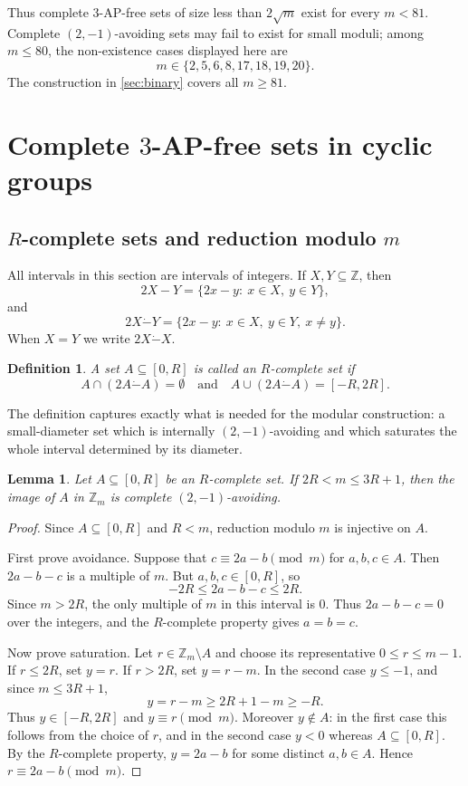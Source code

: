 \documentclass[11pt]{article}
\newtheorem{lemma}[theorem]{Lemma}
\newtheorem{definition}[theorem]{Definition}
\newcommand{\Z}{\mathbb Z}
\newcommand{\dotminus}{\mathbin{\dot{-}}}
\newcommand{\wt}{\mathrm{wt}}
\begin{document}
	Thus complete $3$-AP-free sets of size less than $2\sqrt m$ exist for every $m<81$.  Complete $(2,-1)$-avoiding sets may fail to exist for small moduli; among $m\le80$, the non-existence cases displayed here are
	\[
	m\in\{2,5,6,8,17,18,19,20\}.
	\]
	The construction in \cref{sec:binary} covers all $m\ge81$.
	\section{Complete $3$-AP-free sets in cyclic groups} \label{sec:cyclic}
	
	\subsection{$R$-complete sets and reduction modulo $m$}\label{sec: blocks}
	
	All intervals in this section are intervals of integers.  If $X,Y\subseteq\Z$, then
	\[
	2X-Y=\{2x-y:\ x\in X,\ y\in Y\},
	\]
	and
	\[
	2X\dotminus Y=\{2x-y:\ x\in X,\ y\in Y,\ x\ne y\}.
	\]
	When $X=Y$ we write $2X\dotminus X$.
	
	\begin{definition}\label{def:block}
		A set $A\subseteq[0,R]$ is called an \emph{$R$-complete set} if
		\[
		A\cap(2A\dotminus A)=\emptyset
		\quad\text{and}\quad
		A\cup(2A\dotminus A)=[-R,2R].
		\]
	\end{definition}
	
	The definition captures exactly what is needed for the modular construction: a small-diameter set which is internally $(2,-1)$-avoiding and which saturates the whole interval determined by its diameter.
	
	\begin{lemma}\label{lem:modreduction}
		Let $A\subseteq[0,R]$ be an $R$-complete set.  If
		$  2R<m\le 3R+1$,
		then the image of $A$ in $\Z_m$ is complete $(2,-1)$-avoiding.
	\end{lemma}
	
	\begin{proof}
		Since $A\subseteq[0,R]$ and $R<m$, reduction modulo $m$ is injective on $A$.
		
		First prove avoidance.  Suppose that
		$  c\equiv 2a-b \pmod m$
		for $a,b,c\in A$.  Then $2a-b-c$ is a multiple of $m$.  But $a,b,c\in[0,R]$, so
		$$ -2R\le 2a-b-c\le2R.$$
		Since $m>2R$, the only multiple of $m$ in this interval is $0$.  Thus $2a-b-c=0$ over the integers, and the $R$-complete property gives $a=b=c$.
		
		Now prove saturation.  Let $r\in\Z_m\setminus A$ and choose its representative $0\le r\le m-1$.  If $r\le2R$, set $y=r$.  If $r>2R$, set $y=r-m$.  In the second case $y\le -1$, and since $m\le3R+1$,
		\[
		y=r-m\ge2R+1-m\ge -R.
		\]
		Thus $y\in[-R,2R]$ and $y\equiv r\pmod m$.  Moreover $y\notin A$: in the first case this follows from the choice of $r$, and in the second case $y<0$ whereas $A\subseteq[0,R]$.  By the $R$-complete property, $y=2a-b$ for some distinct $a,b\in A$.  Hence $r\equiv2a-b\pmod m$.
	\end{proof}
	
\end{document}
